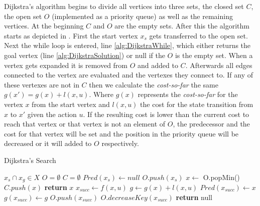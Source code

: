Dijkstra's algorithm begins to divide all vertices into three sets, the closed set $C$, the open set $O$ (implemented as a priority queue) as well as the remaining vertices. At the beginning $C$ and $O$ are the empty sets. After this the algorithm starts as depicted in  \cite{Dijkstra.1959}. First the start vertex $x_s$ gets transferred to the open set. Next the while loop is entered, line \ref{alg:DijkstraWhile}, which either returns the goal vertex (line \ref{alg:DijkstraSolution}) or null if the $O$ is the empty set. When a vertex gets expanded it is removed from $O$ and added to $C$. Afterwards all edges connected to the vertex are evaluated and the vertexes they connect to. If any of these vertexes are not in $C$ then we calculate the \textit{cost-so-far} the same $g(x') = g(x) + l(x,u)$. Where $g(x)$ represents the \textit{cost-so-far} for the vertex $x$ from the start vertex and $l(x,u)$ the cost for the state transition from $x$ to $x'$ given the action $u$. If the resulting cost is lower than the current cost to reach that vertex or that vertex is not an element of $O$, the predecessor and the cost for that vertex will be set and the position in the priority queue will be decreased or it will added to $O$ respectively. \cite{Dijkstra.1959,LaValle.2006,Cormen.2009} 

\begin{algorithm}
    \caption{Dijkstra's Search}\label{alg:Dijkstra}
    \begin{algorithmic}[1]
        \Require $x_s \cap x_g \in X$
        \State $O = \emptyset$
        \State $C = \emptyset$
        \State $Pred(x_s) \gets null$
        \State $O.push(x_s)$
         \label{alg:DijkstraWhile}
            \State $x \gets$ O.popMin()
            \State $C.push(x)$
                \State \textbf{return} $x$ \label{alg:DijkstraSolution}
            \Else
                \State $x_{succ} \gets f(x,u)$
                        \State $g \gets g(x) + l(x,u)$
                            \State $Pred(x_{succ}) \gets x$
                            \State $g(x_{succ}) \gets g$
                                \State $O.push(x_{succ})$
                            \Else
                                \State $O.decreaseKey(x_{succ})$
                            \EndIf
                        \EndIf
                    \EndIf
                \EndFor
            \EndIf
        \EndWhile
        \State \textbf{return} null
    \end{algorithmic}
\end{algorithm}


